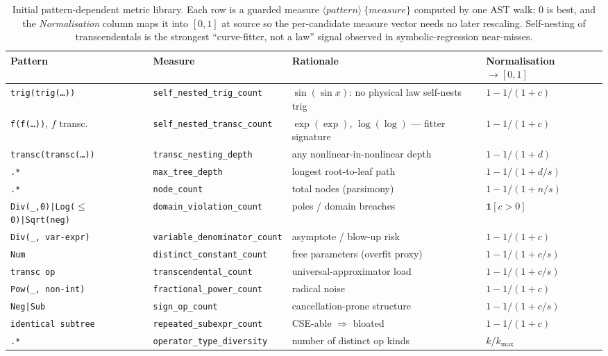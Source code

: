 \documentclass[sigconf]{acmart}
\begin{document}
\begin{table}[t]
\small
\centering
\caption{Initial pattern-dependent metric library. Each row is a guarded
measure $\langle\textit{pattern}\rangle\ \{\textit{measure}\}$ computed by one
AST walk; 0 is best, and the \emph{Normalisation} column maps it into $[0,1]$ at
source so the per-candidate measure vector needs no later rescaling. Self-nesting
of transcendentals is the strongest ``curve-fitter, not a law'' signal observed
in symbolic-regression near-misses.}
\label{tab:metrics}
\begin{tabular}{@{}llp{3.6cm}l@{}}
\toprule
\textbf{Pattern} & \textbf{Measure} & \textbf{Rationale} & \textbf{Normalisation $\to[0,1]$} \\
\midrule
\texttt{trig(trig(\ldots))} & \texttt{self\_nested\_trig\_count} & $\sin(\sin x)$: no physical law self-nests trig & $1-1/(1+c)$ \\
\texttt{f(f(\ldots))}, $f$ transc. & \texttt{self\_nested\_transc\_count} & $\exp(\exp)$, $\log(\log)$ — fitter signature & $1-1/(1+c)$ \\
\texttt{transc(transc(\ldots))} & \texttt{transc\_nesting\_depth} & any nonlinear-in-nonlinear depth & $1-1/(1+d)$ \\
\texttt{.*} & \texttt{max\_tree\_depth} & longest root-to-leaf path & $1-1/(1+d/s)$ \\
\texttt{.*} & \texttt{node\_count} & total nodes (parsimony) & $1-1/(1+n/s)$ \\
\texttt{Div(\_,0)|Log($\le$0)|Sqrt(neg)} & \texttt{domain\_violation\_count} & poles / domain breaches & $\mathbf{1}[c>0]$ \\
\texttt{Div(\_, var-expr)} & \texttt{variable\_denominator\_count} & asymptote / blow-up risk & $1-1/(1+c)$ \\
\texttt{Num} & \texttt{distinct\_constant\_count} & free parameters (overfit proxy) & $1-1/(1+c/s)$ \\
\texttt{transc op} & \texttt{transcendental\_count} & universal-approximator load & $1-1/(1+c/s)$ \\
\texttt{Pow(\_, non-int)} & \texttt{fractional\_power\_count} & radical noise & $1-1/(1+c)$ \\
\texttt{Neg|Sub} & \texttt{sign\_op\_count} & cancellation-prone structure & $1-1/(1+c/s)$ \\
\texttt{identical subtree} & \texttt{repeated\_subexpr\_count} & CSE-able $\Rightarrow$ bloated & $1-1/(1+c)$ \\
\texttt{.*} & \texttt{operator\_type\_diversity} & number of distinct op kinds & $k/k_{\max}$ \\

\end{tabular}
\end{table}
\end{document}
